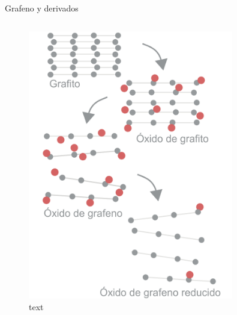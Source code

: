 \documentclass[aspectratio=169]{beamer}
\begin{document}
\begin{frame}{Grafeno y derivados}
\begin{columns}
\begin{column}{0.4\textwidth}
\begin{onlyenv}
\begin{figure}
						\includegraphics[width=0.8\textwidth]{graphiteTORGO_stack.pdf}
						\caption{text}
					\end{figure}
				\end{onlyenv}
			\end{column}
		\end{columns}
	\end{frame}

\end{document}
